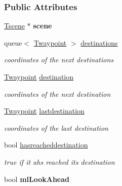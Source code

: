 \subsubsection*{Public Attributes}
\begin{DoxyCompactItemize}
\item 
\hypertarget{classTagent_a032e3d280ef715343cbc856583055e4d}{
\hyperlink{classTscene}{Tscene} $\ast$ {\bfseries scene}}
\label{classTagent_a032e3d280ef715343cbc856583055e4d}

\item 
\hypertarget{classTagent_a3348134426752862e48c4a2fe172a9f6}{
queue$<$ \hyperlink{classTwaypoint}{Twaypoint} $>$ \hyperlink{classTagent_a3348134426752862e48c4a2fe172a9f6}{destinations}}
\label{classTagent_a3348134426752862e48c4a2fe172a9f6}

\begin{DoxyCompactList}\small\item\em coordinates of the next destinations \item\end{DoxyCompactList}\item 
\hypertarget{classTagent_a2b41f8130b8bb00e6a3c8c79c79edd6e}{
\hyperlink{classTwaypoint}{Twaypoint} \hyperlink{classTagent_a2b41f8130b8bb00e6a3c8c79c79edd6e}{destination}}
\label{classTagent_a2b41f8130b8bb00e6a3c8c79c79edd6e}

\begin{DoxyCompactList}\small\item\em coordinates of the next destination \item\end{DoxyCompactList}\item 
\hypertarget{classTagent_a4c2a1032967c1ee77d6653bed3add11c}{
\hyperlink{classTwaypoint}{Twaypoint} \hyperlink{classTagent_a4c2a1032967c1ee77d6653bed3add11c}{lastdestination}}
\label{classTagent_a4c2a1032967c1ee77d6653bed3add11c}

\begin{DoxyCompactList}\small\item\em coordinates of the last destination \item\end{DoxyCompactList}\item 
\hypertarget{classTagent_a8fadd71e1d04b1c761562f210ce5e3d8}{
bool \hyperlink{classTagent_a8fadd71e1d04b1c761562f210ce5e3d8}{hasreacheddestination}}
\label{classTagent_a8fadd71e1d04b1c761562f210ce5e3d8}

\begin{DoxyCompactList}\small\item\em true if it ahs reached its destination \item\end{DoxyCompactList}\item 
\hypertarget{classTagent_a805a86c70d6af6432a54ab213698206c}{
bool {\bfseries mlLookAhead}}
\label{classTagent_a805a86c70d6af6432a54ab213698206c}


\end{DoxyCompactItemize}
